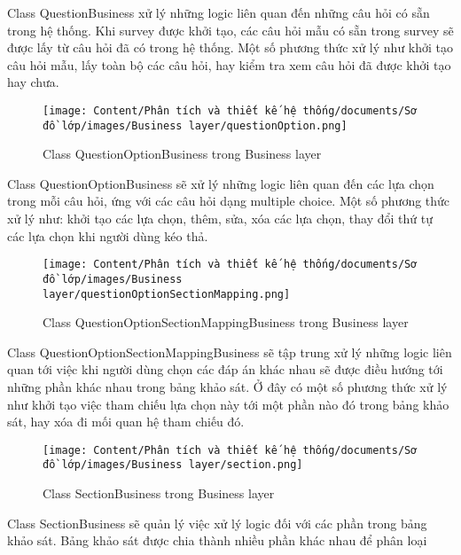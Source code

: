 \par
Class QuestionBusiness xử lý những logic liên quan đến những câu hỏi có sẵn trong hệ thống. Khi survey được khởi tạo, các câu hỏi mẫu có sẵn 
trong survey sẽ được lấy từ câu hỏi đã có trong hệ thống. Một số phương thức xử lý như khởi tạo câu hỏi mẫu, lấy toàn bộ các câu hỏi, hay kiểm tra xem câu hỏi đã được khởi tạo hay chưa.
\begin{figure}[H]
    \centering
    \texttt{[image: Content/Phân tích và thiết kế hệ thống/documents/Sơ đồ lớp/images/Business layer/questionOption.png]}
    \vspace{0.5cm}
    \caption{Class QuestionOptionBusiness trong Business layer}
    \label{fig:Class QuestionOptionBusiness trong Business layer}
\end{figure}
\par
Class QuestionOptionBusiness sẽ xử lý những logic liên quan đến các lựa chọn trong mỗi câu hỏi, ứng với các câu hỏi dạng multiple choice. 
Một số phương thức xử lý như: khởi tạo các lựa chọn, thêm, sửa, xóa các lựa chọn, thay đổi thứ tự các lựa chọn khi người dùng kéo thả.
\begin{figure}[H]
    \centering
    \texttt{[image: Content/Phân tích và thiết kế hệ thống/documents/Sơ đồ lớp/images/Business layer/questionOptionSectionMapping.png]}
    \vspace{0.5cm}
    \caption{Class QuestionOptionSectionMappingBusiness trong Business layer}
    \label{fig:Class QuestionOptionSectionMappingBusiness trong Business layer}
\end{figure}
\par
Class QuestionOptionSectionMappingBusiness sẽ tập trung xử lý những logic liên quan tới việc khi người dùng chọn các đáp án khác nhau sẽ được 
điều hướng tới những phần khác nhau trong bảng khảo sát. Ở đây có một số phương thức xử lý như khởi tạo việc tham chiếu lựa chọn này tới một phần nào đó 
trong bảng khảo sát, hay xóa đi mối quan hệ tham chiếu đó.
\begin{figure}[H]
    \centering
    \texttt{[image: Content/Phân tích và thiết kế hệ thống/documents/Sơ đồ lớp/images/Business layer/section.png]}
    \vspace{0.5cm}
    \caption{Class SectionBusiness trong Business layer}
    \label{fig:Class SectionBusiness trong Business layer}
\end{figure}
\par
Class SectionBusiness sẽ quản lý việc xử lý logic đối với các phần trong bảng khảo sát. Bảng khảo sát được chia thành nhiều phần khác nhau để phân loại 
